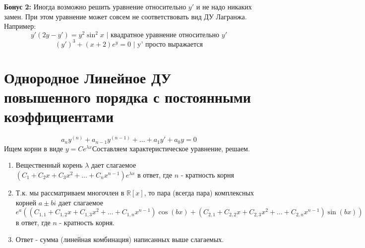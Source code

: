\documentclass[11pt]{article}
\begin{document}
	\textbf{Бонус 2:} Иногда возможно решить уравнение относительно $y'$ и не надо никаких замен. При этом уравнение может совсем не соответствовать вид ДУ Лагранжа. Например:
	$$y'(2y - y') = y^2 \sin^2 x \text{ | квадратное уравнение относительно } y'$$ 
	$$(y')^3 + (x+2)e^y = 0 \text{ | y' просто выражается}$$ 

	\section{Однородное Линейное ДУ повышенного порядка с постоянными коэффициентами}
	$$a_{n} y^{(n)} +a_{n-1} y^{(n-1)} + \dots + a_{1} y' + a_{0} y = 0 $$
	Ищем корни в виде $y = Ce^{\lambda x}$Составляем характеристическое уравнение, решаем.
	\begin{enumerate}
		\item Вещественный корень $\lambda$ дает слагаемое $(C_1 + C_2 x + C_3 x^2 + \dots + C_n x^{n-1})e^{\lambda x}$ в ответ, где $n$ - кратность корня
		\item Т.к. мы рассматриваем многочлен в $\mathbb{R}[x]$, то пара (всегда пара) комплексных корней $a \pm bi$ дает слагаемое $e^a((C_{1, 1} + C_{1, 2} x + C_{1, 3} x^2 + \dots + C_{1, n} x^{n-1}) \cos(bx) + (C_{2, 1} + C_{2, 2} x + C_{2, 3} x^2 + \dots + C_{2, n} x^{n-1}) \sin(bx))$ в ответ, где $n$ - кратность корня.
		\item Ответ - сумма (линейная комбинация) написанных выше слагаемых.
		
	\end{enumerate}
\end{document}
